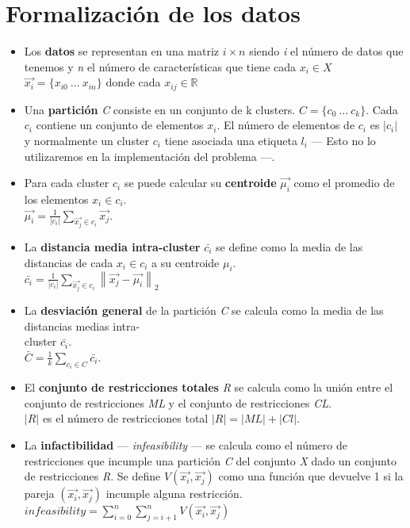 \section{Formalización de los datos}
\begin{itemize}
   \item Los \textbf{datos} se representan en una matriz $ i \times n $ siendo \emph{i} el número de datos que tenemos y \emph{n} el número de características que tiene cada $ x_{i} \in X $ \\
   $ \vec{x_{i}} = \{x_{i0}\ ...\ x_{in}\} $ donde cada $ x_{ij} \in \mathbb{R} $
   \item Una \textbf{partición} \emph{C} consiste en un conjunto de k clusters. $ C = \{c_{0}\ ...\ c_{k}\} $. Cada $ c_{i} $ contiene un conjunto de elementos $ x_{i} $. El número de elementos de $ c_{i} $ es $ \left | c_{i} \right | $ y normalmente un cluster $ c_{i} $ tiene asociada una etiqueta $ l_{i} $ --- Esto no lo utilizaremos en la implementación del problema ---.
   \item Para cada cluster $ c_{i} $ se puede calcular su \textbf{centroide} $ \vec{\mu_{i}} $ como el promedio de los elementos $ x_{i} \in c_{i} $.\\
   $ \vec{\mu_{i}} = \frac{1}{\left | c_{i} \right |}\sum_{\vec{x_{j}} \in c_{i}} \vec{x_{j}} $.
   \item La \textbf{distancia media intra-cluster} $ \bar{c_{i}} $ se define como la media de las distancias de cada $ x_{i} \in c_{i} $ a su centroide $ \mu_{i} $.\\
   $ \bar{c_{i}} = \frac{1}{\left | c_{i} \right |}\sum_{\vec{x_{j}} \in c_{i}} \left \| \vec{x_{j}} - \vec{\mu_{i}} \right \|_{2} $
   \item La \textbf{desviación general} de la partición \emph{C} se calcula como la media de las distancias medias intra-\\cluster $ \bar{c_{i}} $.\\
   $ \bar{C} = \frac{1}{k}\sum_{c_{i} \in C} \bar{c_i} $.
   \item El \textbf{conjunto de restricciones totales} \emph{R} se calcula como la unión entre el conjunto de restricciones \emph{ML} y el conjunto de restricciones \emph{CL}.\\
   $ \left | R \right | $ es el número de restricciones total $ \left | R \right | = \left | ML \right | + \left | Cl \right | $.
   \item La \textbf{infactibilidad} --- \emph{infeasibility} --- se calcula como el número de restricciones que incumple una partición \emph{C} del conjunto \emph{X} dado un conjunto de restricciones \emph{R}. Se define $ V(\vec{x_{i}},\vec{x_{j}}) $ como una función que devuelve 1 si la pareja $ (\vec{x_{i}},\vec{x_{j}}) $ incumple alguna restricción.\\
   $ infeasibility = \sum_{i=0}^{n} \sum_{j=i+1}^{n} V(\vec{x_{i}},\vec{x_{j}}) $
\end{itemize}

